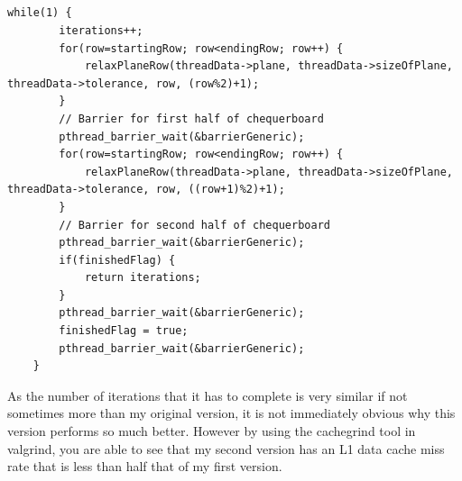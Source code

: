 \documentclass{report}
\begin{document}
\\\\\\\\
\begin{lstlisting}[style=customc,caption=Version 2 Parallel Main Loop]
    while(1) {
        iterations++;
        for(row=startingRow; row<endingRow; row++) {
            relaxPlaneRow(threadData->plane, threadData->sizeOfPlane, threadData->tolerance, row, (row%2)+1);
        }
        // Barrier for first half of chequerboard
        pthread_barrier_wait(&barrierGeneric);        
        for(row=startingRow; row<endingRow; row++) {
            relaxPlaneRow(threadData->plane, threadData->sizeOfPlane, threadData->tolerance, row, ((row+1)%2)+1);
        }
        // Barrier for second half of chequerboard
        pthread_barrier_wait(&barrierGeneric);
        if(finishedFlag) {
            return iterations;
        }
        pthread_barrier_wait(&barrierGeneric);
        finishedFlag = true;
        pthread_barrier_wait(&barrierGeneric);
    }
\end{lstlisting}

As the number of iterations that it has to complete is very similar if not sometimes more than my original version, it is not immediately obvious why this version performs so much better. However by using the cachegrind tool in valgrind, you are able to see that my second version has an L1 data cache miss rate that is less than half that of my first version.
\end{document}
